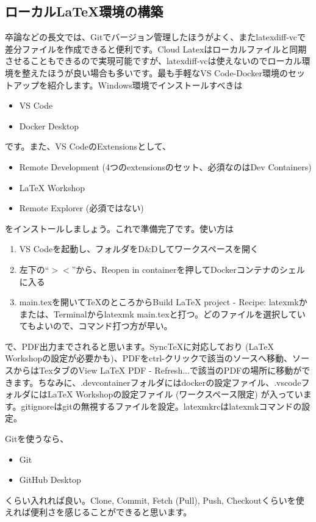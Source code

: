 \documentclass[uplatex,dvipdfmx,a4j,9pt,twocolumn,twoside]{jsarticle}
\begin{document}
\subsection{ローカル\LaTeX 環境の構築}

卒論などの長文では、Gitでバージョン管理したほうがよく、またlatexdiff-vcで差分ファイルを作成できると便利です。Cloud Latexはローカルファイルと同期させることもできるので実現可能ですが、latexdiff-vcは使えないのでローカル環境を整えたほうが良い場合も多いです。最も手軽なVS Code-Docker環境のセットアップを紹介します。Windows環境でインストールすべきは
\begin{itemize}
  \item VS Code
  \item Docker Desktop
\end{itemize}
です。また、VS CodeのExtensionsとして、
\begin{itemize}
  \item Remote Development (4つのextensionsのセット、必須なのはDev Containers)
  \item LaTeX Workshop
  \item Remote Explorer (必須ではない)
\end{itemize}
をインストールしましょう。これで準備完了です。使い方は
\begin{enumerate}
  \item VS Codeを起動し、フォルダをD\&Dしてワークスペースを開く
  \item 左下の``$><$''から、Reopen in containerを押してDockerコンテナのシェルに入る
  \item main.texを開いて\TeX のところからBuild LaTeX project - Recipe: latexmkかまたは、Terminalからlatexmk main.texと打つ。どのファイルを選択していてもよいので、コマンド打つ方が早い。
\end{enumerate}
で、PDF出力までされると思います。SyncTeXに対応しており (LaTeX Workshopの設定が必要かも)、PDFをctrl-クリックで該当のソースへ移動、ソースからはTexタブのView LaTeX PDF - Refresh...で該当のPDFの場所に移動ができます。ちなみに、.devcontainerフォルダにはdockerの設定ファイル、.vscodeフォルダにはLaTeX Workshopの設定ファイル (ワークスペース限定) が入っています。gitignoreはgitの無視するファイルを設定。latexmkrcはlatexmkコマンドの設定。

Gitを使うなら、
\begin{itemize}
  \item Git
  \item GitHub Desktop
\end{itemize}
くらい入れれば良い。Clone, Commit, Fetch (Pull), Push, Checkoutくらいを使えれば便利さを感じることができると思います。
\end{document}
